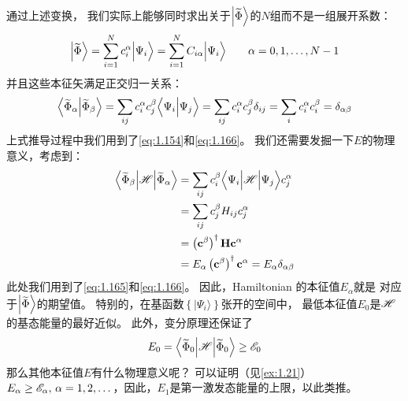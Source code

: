 通过上述变换，
我们实际上能够同时求出关于$\Ket{\widetilde\Phi}$的$N$组而不是一组展开系数：
\begin{equation}
 \Ket{\widetilde\Phi} = \sum_{i=1}^N c_i^\alpha \Big\vert\Psi_i\Big\rangle = \sum_{i=1}^N C_{i\alpha}\Big\vert\Psi_i\Big\rangle \qquad \alpha = 0, 1, \dots, N-1
 \label{eq:1.168}
\end{equation}
并且这些本征矢满足正交归一关系：
\begin{equation}
 \Big\langle\widetilde\Phi_\alpha\Big\vert\widetilde\Phi_\beta\Big\rangle = \sum_{ij} c_i^\alpha c_j^\beta \Big\langle\Psi_i\Big\vert\Psi_j\Big\rangle = \sum_{ij}c_i^\alpha c_j^\beta\delta_{ij} = \sum_i c_i^\alpha c_i^\beta = \delta_{\alpha\beta}
 \label{eq:1.169}
\end{equation}
上式推导过程中我们用到了\autoref{eq:1.154}和\autoref{eq:1.166}。
我们还需要发掘一下$E$的物理意义，考虑到：
\begin{equation}
 \begin{split}
     \Big\langle\widetilde\Phi_\beta\Big\vert\mathscr{H}\Big\vert\widetilde\Phi_\alpha\Big\rangle &= \sum_{ij} c_i^\beta \Big\langle \Psi_i\Big\vert\mathscr{H}\Big\vert\Psi_j\Big\rangle c_j^\alpha \\
     &= \sum_{ij}c_j^\beta H_{ij}c_j^\alpha \\
     &= \left(\mathbf{c}^\beta\right)^\dagger\mathbf{H}\mathbf{c}^\alpha \\
     &= E_\alpha \left(\mathbf{c}^\beta\right)^\dagger\mathbf{c}^\alpha = E_\alpha \delta_{\alpha\beta}
 \end{split}
 \label{eq:1.170}
\end{equation}
此处我们用到了\autoref{eq:1.165}和\autoref{eq:1.166}。
因此，Hamiltonian 的本征值$E_\alpha$就是 对应于$\Ket{\widetilde\Phi}$的期望值。
特别的，在基函数$\left\{\vert\Psi_i\rangle\right\}$张开的空间中，
最低本征值$E_0$是$\mathscr{H}$的基态能量的最好近似。
此外，变分原理还保证了
\begin{equation}
 E_0 = \Big\langle\widetilde\Phi_0\Big\vert\mathscr{H}\Big\vert\widetilde\Phi_0\Big\rangle \geq \mathscr{E}_0
 \label{eq:1.171}
\end{equation}
那么其他本征值$E$有什么物理意义呢？
可以证明（见\autoref{ex:1.21}）
$E_\alpha \geq \mathscr{E}_\alpha,\, \alpha = 1, 2, \dots$，因此，$E_1$是第一激发态能量的上限，以此类推。

